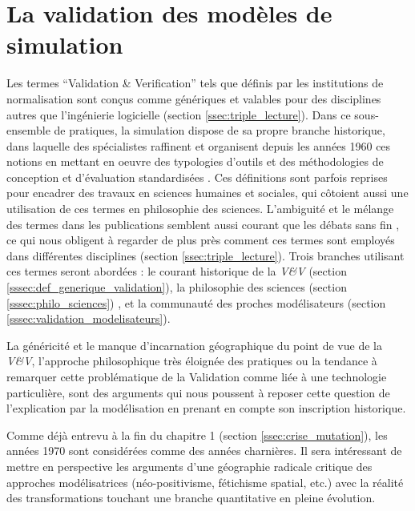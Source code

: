 
\section{La validation des modèles de simulation}
\label{sec:constante_problematique}

Les termes \foreignquote{english}{Validation \& Verification} tels que définis par les institutions de normalisation sont conçus comme génériques et valables pour des disciplines autres que l'ingénierie logicielle (section \ref{ssec:triple_lecture}). Dans ce sous-ensemble de pratiques, la simulation dispose de sa propre branche historique, dans laquelle des spécialistes raffinent et organisent depuis les années 1960 ces notions en mettant en oeuvre des typologies d'outils et des méthodologies de conception et d'évaluation standardisées \autocite{Nance2002}. Ces définitions sont parfois reprises pour encadrer des travaux en sciences humaines et sociales, qui côtoient aussi une utilisation de ces termes en philosophie des sciences. L'ambiguité et le mélange des termes dans les publications semblent aussi courant que les débats sans fin \autocites{David2009,Augusiak2014}, ce qui nous obligent à regarder de plus près comment ces termes sont employés dans différentes disciplines (section \ref{ssec:triple_lecture}). Trois branches utilisant ces termes seront abordées : le courant historique de la \textit{V\&V} (section \ref{sssec:def_generique_validation}), la philosophie des sciences (section \ref{sssec:philo_sciences}) , et la communauté des proches modélisateurs (section \ref{sssec:validation_modelisateurs}).


La généricité et le manque d'incarnation géographique du point de vue de la \textit{V\&V}, l'approche philosophique très éloignée des pratiques ou la tendance à remarquer cette problématique de la Validation comme liée à une technologie particulière, sont des arguments qui nous poussent à reposer cette question de l'explication par la modélisation en prenant en compte son inscription historique.

Comme déjà entrevu à la fin du chapitre 1 (section \ref{ssec:crise_mutation}), les années 1970 sont considérées comme des années charnières. Il sera intéressant de mettre en perspective les arguments d'une géographie radicale critique des approches modélisatrices (néo-positivisme, fétichisme spatial, etc.) avec la réalité des transformations touchant une branche quantitative en pleine évolution.

